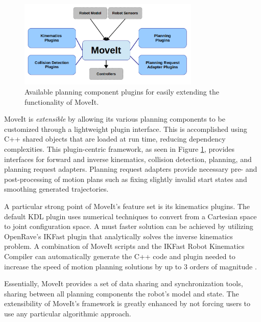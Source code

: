 \documentclass[10pt,journal,compsoc]{joser1}
\begin{document}
{\begin{figure}[!t]
\centering
\includegraphics[width=3.4in]{images/moveit_plugins}
\caption{Available planning component plugins for easily extending the functionality of MoveIt.}
\label{fig:moveit_plugins}
\end{figure}

MoveIt is \textit{extensible} by allowing its various planning components to be customized through a lightweight plugin interface. This is accomplished using C++ shared objects that are loaded at run time, reducing dependency complexities. This plugin-centric framework, as seen in Figure \ref{fig:moveit_plugins}, provides interfaces for forward and inverse kinematics, collision detection, planning, and planning request adapters. Planning request adapters provide necessary pre- and post-processing of motion plans such as fixing slightly invalid start states and smoothing generated trajectories.

A particular strong point of MoveIt's feature set is its kinematics plugins. The default KDL plugin uses numerical techniques to convert from a Cartesian space to joint configuration space. A must faster solution can be achieved by utilizing OpenRave's IKFast \cite{ikfast} plugin that analytically solves the inverse kinematics problem. A combination of MoveIt scripts and the IKFast Robot Kinematics Compiler can automatically generate the C++ code and plugin needed to increase the speed of motion planning solutions by up to 3 orders of magnitude \cite{ikfast}.

Essentially, MoveIt provides a set of data sharing and synchronization tools, sharing between all planning components the robot's model and state. The extensibility of MoveIt's framework is greatly enhanced by not forcing users to use any particular algorithmic approach. 

}
\end{document}
